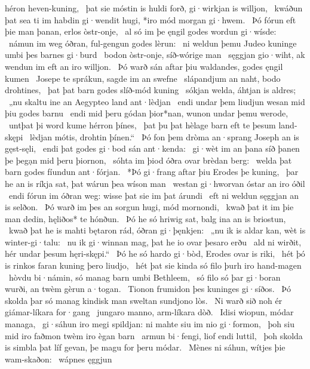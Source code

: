 héron heven-kuning, \hld\ þat sie móstin is huldi forð,
gi·wirkjan is willjon, \hld\ kwáðun þat sea ti im habdin gi·wendit hugi,
*iro mód morgan gi·hwem. \hld\ Þó fórun eft þie man þanan,
erlos òstr-onje, \hld\ al só im þe ęngil godes
wordun gi·wísde: \hld\ námun im weg óðran,
ful-gengun godes lèrun: \hld\ ni weldun þemu Judeo kuninge
umbi þes barnes gi·burd \hld\ bodon òstr-onje,
síð-wórige man \hld\ sęggjan gio·wiht,
ak wendun im eft an iro willjon. \hld\ Þó warð sán aftar þiu waldandes,
godes ęngil kumen \hld\ Josepe te sprákun,
sagde im an swefne \hld\ slápandjum an naht,
bodo drohtines, \hld\ þat þat barn godes
slíð-mód kuning \hld\ sókjan welda,
áhtjan is aldres; \hld\ „nu skaltu ine an Aegypteo
land ant·lèdjan \hld\ endi undar þem liudjun wesan
mid þiu godes barnu \hld\ endi mid þeru gódan þior*nan,
wunon undar þemu werode, \hld\ untþat þi word kume
hérron þínes, \hld\ þat þu þat hèlage barn
eft te þesum land-skępi \hld\ lèdjan mótis,
drohtin þínen.“ \hld\ Þó fon þem dròma an·sprang
Joseph an is gęst-sęli, \hld\ endi þat godes gi·bod
sán ant·kenda: \hld\ gi·wèt im an þana síð þanen
þe þegạn mid þeru þiornon, \hld\ sóhta im þiod óðra
ovar brèdan berg: \hld\ welda þat barn godes
fíundun ant·fórjan. \hld\ *Þó gi·frang aftar þiu %
Erodes þe kuning, \hld\ þar he an is ríkja sat,
þat wárun þea wíson man \hld\ westan gi·hworvan
óstar an iro óðil \hld\ endi fórun im óðran weg:
wisse þat sie im þat árundi \hld\ eft ni weldun
sęggjan an is selðon. \hld\ Þó warð im þes an sorgun hugi,
mód mornondi, \hld\ kwað þat it im þie man dedin,
hęliðos* te hónðun. \hld\ Þó he só hriwig sat,
balg ina an is briostun, \hld\ kwað þat he is mahti bętaron rád,
óðran gi·þęnkjen: \hld\ „nu ik is aldar kan,
wèt is winter-gi·talu: \hld\ nu ik gi·winnan mag,
þat he io ovar þesaro erðu \hld\ ald ni wirðit,
hér undar þesum hęri-skępi.“ \hld\ Þó he só hardo gi·bòd,
Erodes ovar is riki, \hld\ hét þó is rinkos faran
kuning þero liudjo, \hld\ hét þat sie kinda só filo
þurh iro hand-magen \hld\ hòvdu bi·námin,
só manag barn umbi Bethleem, \hld\ só filo só þar gi·boran wurði,
an twèm gèrun a·togan. \hld\ Tionon frumidon
þes kuninges gi·síðos. \hld\ Þó skolda þar só manag kindisk man
sweltan sundjono lòs. \hld\ Ni warð sið noh ér
giámar-líkara for·gang \hld\ jungaro manno,
arm-líkara dòð. \hld\ Idisi wiopun,
módar managa, \hld\ gi·sáhun iro megi spildjan:
ni mahte siu im nio gi·formon, \hld\ þoh siu mid iro faðmon twèm
iro ègan barn \hld\ armun bi·fengi,
liof endi luttil, \hld\ þoh skolda is simbla þat líf gevan,
þe magu for þeru módar. \hld\ Mènes ni sáhun,
wítjes þie wam-skaðon: \hld\ wápnes ęggjun
